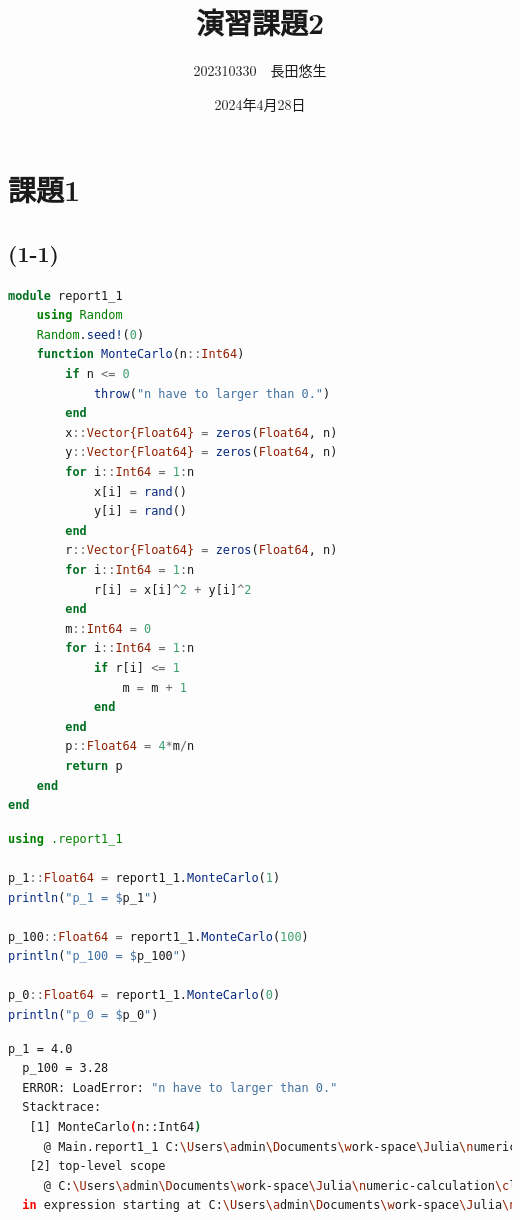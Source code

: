 \documentclass[uplatex, dvipdfmx, a4j,11pt]{jsarticle}
\title{演習課題2}
\author{202310330　長田悠生}
\date{2024年4月28日}
\begin{document}
\section*{課題1}
\subsection*{(1-1)}
\begin{lstlisting}[title={(1-1)のソースコード}, label=code:in, language=Julia]
module report1_1
    using Random
    Random.seed!(0)
    function MonteCarlo(n::Int64)
        if n <= 0
            throw("n have to larger than 0.")
        end
        x::Vector{Float64} = zeros(Float64, n)
        y::Vector{Float64} = zeros(Float64, n)
        for i::Int64 = 1:n
            x[i] = rand()
            y[i] = rand()
        end
        r::Vector{Float64} = zeros(Float64, n)
        for i::Int64 = 1:n
            r[i] = x[i]^2 + y[i]^2
        end
        m::Int64 = 0
        for i::Int64 = 1:n
            if r[i] <= 1
                m = m + 1
            end
        end
        p::Float64 = 4*m/n
        return p
    end
end
\end{lstlisting}

\newpage
{}

\begin{lstlisting}[title={上記の関数に具体的なnの値を入れてみたときのソースコード}, label=code:in, language=Julia]
using .report1_1

p_1::Float64 = report1_1.MonteCarlo(1)
println("p_1 = $p_1")

p_100::Float64 = report1_1.MonteCarlo(100)
println("p_100 = $p_100")

p_0::Float64 = report1_1.MonteCarlo(0)
println("p_0 = $p_0")

\end{lstlisting}

\begin{lstlisting}[title={実行結果}, label=code:in, language=sh]
  p_1 = 4.0
  p_100 = 3.28
  ERROR: LoadError: "n have to larger than 0."
  Stacktrace:
   [1] MonteCarlo(n::Int64)
     @ Main.report1_1 C:\Users\admin\Documents\work-space\Julia\numeric-calculation\class2_report\src\report1-1.jl:9
   [2] top-level scope
     @ C:\Users\admin\Documents\work-space\Julia\numeric-calculation\class2_report\src\report1-1.jl:48
  in expression starting at C:\Users\admin\Documents\work-space\Julia\numeric-calculation\class2_report\src\report1-1.jl:48

\end{lstlisting}
\end{document}
